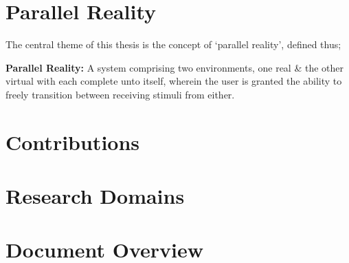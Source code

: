 

\section{Parallel Reality}

The central theme of this thesis is the concept of `parallel reality', defined thus;

\textbf{Parallel Reality:} A system comprising two environments, one real \& the other virtual with each complete unto itself, wherein the user is granted the ability to freely transition between receiving stimuli from either.
 

\section{Contributions}


\section{Research Domains}


\section{Document Overview}


















